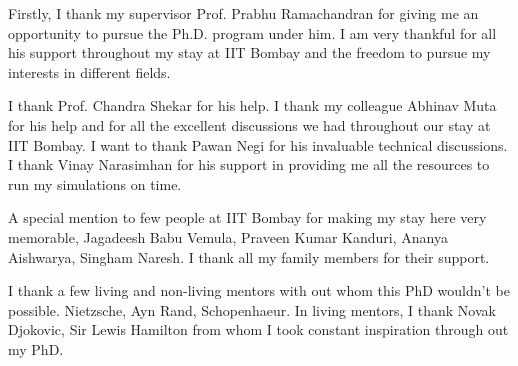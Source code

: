 \acknowledgments


Firstly, I thank my supervisor Prof. Prabhu Ramachandran for giving me an
opportunity to pursue the Ph.D. program under him. I am very thankful for all
his support throughout my stay at IIT Bombay and the freedom to pursue my
interests in different fields.


I thank Prof. Chandra Shekar for his help. I thank my colleague Abhinav Muta for
his help and for all the excellent discussions we had throughout our stay at IIT
Bombay. I want to thank Pawan Negi for his invaluable technical discussions. I
thank Vinay Narasimhan for his support in providing me all the resources to run
my simulations on time.

A special mention to few people at IIT Bombay for making my stay here very
memorable, Jagadeesh Babu Vemula, Praveen Kumar Kanduri, Ananya Aishwarya,
Singham Naresh. I thank all my family members for their support.

I thank a few living and non-living mentors with out whom this PhD wouldn't be
possible. Nietzsche, Ayn Rand, Schopenhaeur. In living mentors, I thank Novak
Djokovic, Sir Lewis Hamilton from whom I took constant inspiration through out
my PhD.


\signature{\today}


